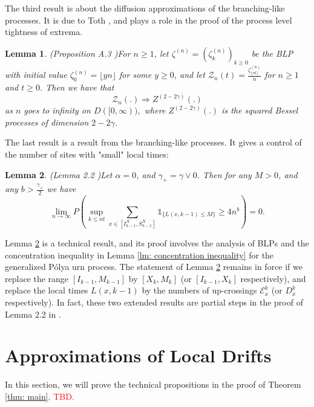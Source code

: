 \documentclass[twoside,12pt,a4paper]{article}
\newtheorem{lemma}{Lemma}[section]
\numberwithin{equation}{section}
\newcommand\TBD{\textcolor{red}{TBD.}}
\begin{document}
{The third result is about the diffusion approximations of the branching-like processes. It is due to Toth \cite{T96}, and plays a role in the proof of the process level tightness of extrema. 

\begin{lemma}(Proposition A.3 \cite{KMP22})\label{lm: diffusion approximation of blp}
	For $n\geq 1$, let $\zeta^{(n)}=(\zeta^{(n)}_k)_{k\geq 0 }  $ be the BLP with initial value $\zeta^{(n)}_0 = \lfloor yn \rfloor$ for some $y \geq 0$, and let $\mathcal{Z}_n(t) = \frac{\zeta^{(n)}_{\lfloor nt \rfloor}}{n}$ for $n\geq 1$ and $t\geq 0$. Then we have that 
	$$
	\mathcal{Z}_n(.) \Longrightarrow Z^{(2-2\gamma)}(.)
	$$ as $n$ goes to infinity on $D([0,\infty)),$ where $Z^{(2-2\gamma)}(.)$ is the squared Bessel processes of dimension $2-2\gamma$.
\end{lemma}

The last result is a result from the branching-like processes. It gives a control of the number of sites with "small" local times:
\begin{lemma}(Lemma 2.2 \cite{KMP22})\label{lm: number of rarely visit sites}
	Let $\alpha =0$, and $\gamma_+ = \gamma \vee 0$. Then for any $M>0$, and any $b>\frac{\gamma_+}{2}$ we have
	$$
	\lim_{n\to\infty} P\left(\sup_{k\leq nt}  \sum_{x\in [I^X_{k-1}, S^X_{k-1}]} \mathbb{1}_{\{ L(x,k-1) \leq M \}} \geq 4n^b \right) = 0.
	$$
	
\end{lemma}	
Lemma \ref{lm: number of rarely visit sites} is a technical result, and its proof involves the analysis of BLPs and the concentration inequality in Lemma \ref{lm: concentration inequality} for the generalized P\'{o}lya urn process. The statement of Lemma \ref{lm: number of rarely visit sites} remains in force if we replace the range $[I_{k-1}, M_{k-1}]$ by $[X_k,M_k]$ (or $[I_{k-1},X_k]$ respectively), and replace the local times $L(x,k-1)$ by the numbers of up-crossings $\mathcal{E}^{k}_x$ (or $D^{k}_x$ respectively). In fact, these two extended results are partial steps in the proof of Lemma 2.2 in \cite{KMP22}.   


\section{Approximations of Local Drifts}\label{sec: approximations}
In this section, we will prove the technical propositions in the proof of Theorem \ref{thm: main}. \TBD


}
\end{document}
